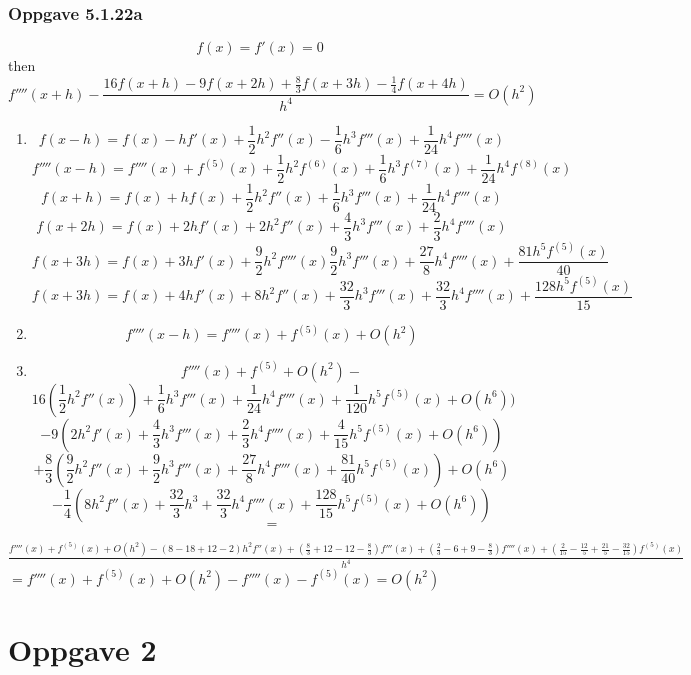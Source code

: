 \documentclass{article}
\begin{document}
    \subsubsection{Oppgave 5.1.22a}
    \[f(x) = f'(x) = 0\]
    then
    \[f''''(x+h) - \frac{16f(x+h) - 9f(x+2h) + \frac{8}{3}f(x+3h)-\frac{1}{4}f(x+4h)}{h^4}=O(h^2)\]
    \begin{enumerate}
    \item \[f(x-h)=f(x)-hf'(x) + \frac{1}{2}h^2f''(x)-\frac{1}{6}h^3f'''(x)+\frac{1}{24}h^4f''''(x)\]
    \[f''''(x-h) = f''''(x) + f^{(5)}(x) + \frac{1}{2}h^2f^{(6)}(x)+\frac{1}{6}h^3f^{(7)}(x)+\frac{1}{24}h^4f^{(8)}(x)\]
    \[f(x+h) = f(x)+hf(x) + \frac{1}{2}h^2f''(x)+\frac{1}{6}h^3f'''(x)+\frac{1}{24}h^4f''''(x)\]
    \[f(x+2h)=f(x)+2hf'(x)+2h^2f''(x)+\frac{4}{3}h^3f'''(x)+\frac{2}{3}h^4f''''(x)\]
    \[f(x+3h)=f(x) + 3hf'(x) + \frac{9}{2}h^2f''''(x)\frac{9}{2}h^3f'''(x)+\frac{27}{8}h^4f''''(x) + \frac{81h^5f^{(5)}(x)}{40}\]
    \[f(x+3h) = f(x)+4hf'(x)+8h^2f''(x) + \frac{32}{3}h^3f'''(x) + \frac{32}{3}h^4f''''(x) + \frac{128h^5f^{(5)}(x)}{15}\]
    
    \item  \[f''''(x-h) = f''''(x) + f^{(5)}(x) + O(h^2)\]
    \item \[f''''(x) + f^{(5)} + O(h^2)-\]
    \[16(\frac{1}{2}h^2f''(x))+\frac{1}{6}h^3f'''(x)+\frac{1}{24}h^4f''''(x)+\frac{1}{120}h^5f^{(5)}(x)+O(h^6))\]
    \[-9(2h^2f'(x)+\frac{4}{3}h^3f'''(x)+\frac{2}{3}h^4f''''(x)+\frac{4}{15}h^5f^{(5)}(x)+O(h^6))\]
    \[+\frac{8}{3}(\frac{9}{2}h^2f''(x)+\frac{9}{2}h^3f'''(x)+\frac{27}{8}h^4f''''(x) + \frac{81}{40}h^5f^{(5)}(x))+O(h^6)\]
    \[-\frac{1}{4}(8h^2f''(x)+\frac{32}{3}h^3+\frac{32}{3}h^4f''''(x)+\frac{128}{15}h^5f^{(5)}(x)+O(h^6))\]
    \[= \]
    
    \end{enumerate}

    \begin{flushleft}
        
    $\frac{f''''(x) + f^{(5)}(x) + O(h^2) - (8-18+12-2)h^2f''(x)+(\frac{8}{3}+12-12-\frac{8}{3})f'''(x) + (\frac{2}{3}-6+9-\frac{8}{3}) f''''(x)+(\frac{2}{15}-\frac{12}{5}+\frac{21}{5} - \frac{32}{15})f^{(5)}(x)}{h^4}$
    $= f''''(x)+f^{(5)}(x)+O(h^2) - f''''(x) - f^{(5)}(x) = O(h^2)$
    \end{flushleft}

    \section{Oppgave 2}
\end{document}
